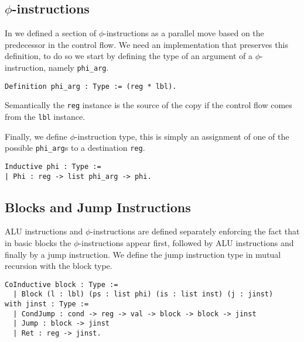 \subsection{$\phi$-instructions}

In  we defined a section of $\phi$-instructions as a parallel move based on the predecessor in the control flow.
We need an implementation that preserves this definition, to do so we start by defining the type of an argument of a $\phi$-instruction, namely \texttt{phi\_arg}.

\begin{lstlisting}[style=Coq]
Definition phi_arg : Type := (reg * lbl).
\end{lstlisting}

Semantically the \texttt{reg} instance is the source of the copy if the control flow comes from the \texttt{lbl} instance.

Finally, we define $\phi$-instruction type, this is simply an assignment of one of the possible \texttt{phi\_arg}s to a destination \texttt{reg}.

\begin{lstlisting}[style=Coq]
Inductive phi : Type :=
| Phi : reg -> list phi_arg -> phi.
\end{lstlisting}


\subsection{Blocks and Jump Instructions}

ALU instructions and $\phi$-instructions are defined separately enforcing the fact that in basic blocks the $\phi$-instructions appear first, followed by ALU instructions and finally by a jump instruction.
We define the jump instruction type in mutual recursion with the block type.

\begin{lstlisting}[style=Coq]
CoInductive block : Type :=
  | Block (l : lbl) (ps : list phi) (is : list inst) (j : jinst)
with jinst : Type :=
  | CondJump : cond -> reg -> val -> block -> block -> jinst
  | Jump : block -> jinst
  | Ret : reg -> jinst.
\end{lstlisting}

